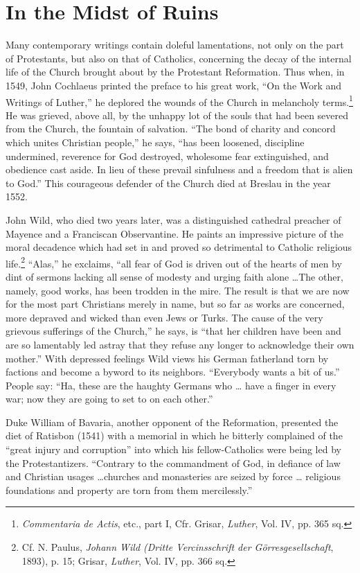 \section{In the Midst of Ruins}

Many contemporary writings contain doleful lamentations, not
only on the part of Protestants, but also on that of Catholics, concerning
the decay of the internal life of the Church brought about
by the Protestant Reformation. Thus when, in 1549, John Cochlaeus
printed the preface to his great work, “On the Work and Writings
of Luther,” he deplored the wounds of the Church in melancholy
terms.\footnote{\textit{Commentaria de Actis}, etc., part I, Cfr. Grisar, \textit{Luther}, Vol. IV, pp. 365 sq.}
 He was grieved, above all, by the unhappy lot of the souls
that had been severed from the Church, the fountain of salvation.
“The bond of charity and concord which unites Christian people,”
he says, “has been loosened, discipline undermined, reverence for God
destroyed, wholesome fear extinguished, and obedience cast aside. In
lieu of these prevail sinfulness and a freedom that is alien to God.”
This courageous defender of the Church died at Breslau in the year
1552.

John Wild, who died two years later, was a distinguished cathedral
preacher of Mayence and a Franciscan Observantine. He paints an
impressive picture of the moral decadence which had set in and
proved so detrimental to Catholic religious life.\footnote
{Cf. N. Paulus, \textit{Johann Wild (Dritte Vercinsschrift der Görresgesellschaft}, 1893), p. 15;
Grisar, \textit{Luther}, Vol. IV, pp. 366 sq.}
“Alas,” he exclaims,
“all fear of God is driven out of the hearts of men by dint of sermons
lacking all sense of modesty and urging faith alone \dots The other,
namely, good works, has been trodden in the mire. The result is that
we are now for the most part Christians merely in name, but so far
as works are concerned, more depraved and wicked than even Jews
or Turks. The cause of the very grievous sufferings of the Church,”
he says, is “that her children have been and are so lamentably led
astray that they refuse any longer to acknowledge their own mother.”
With depressed feelings Wild views his German fatherland torn by
factions and become a byword to its neighbors. “Everybody wants a
bit of us.” People say: “Ha, these are the haughty Germans who \dots
have a finger in every war; now they are going to set to on each
other.”

Duke William of Bavaria, another opponent of the Reformation,
presented the diet of Ratisbon (1541) with a memorial in which
he bitterly complained of the “great injury and corruption” into
which his fellow-Catholics were being led by the Protestantizers.
“Contrary to the commandment of God, in defiance of law and Christian
usages \dots churches and monasteries are seized by force \dots
religious foundations and property are torn from them mercilessly.”

